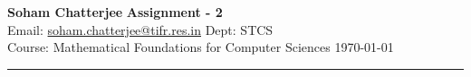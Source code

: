 \documentclass[a4paper, 11pt]{article}
\begin{document}
	
	
	{\noindent \large\textbf{Soham Chatterjee} \hfill \textbf{Assignment - 2}\\
		Email: \href{soham.chatterjee@tifr.res.in}{soham.chatterjee@tifr.res.in} \hfill Dept: STCS\\
		\normalsize Course: Mathematical Foundations for Computer Sciences \hfill \today\\ 
		\noindent\rule{7in}{2.8pt}}
	
	
\end{document}
